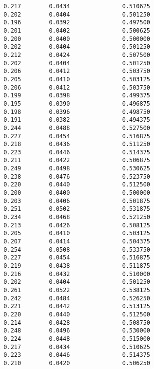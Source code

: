 \documentclass[
  letterpaper,
  DIV=11,
  numbers=noendperiod]{scrartcl}
\begin{document}
\begin{verbatim}
  0.217        0.0434               0.510625              
  0.202        0.0404               0.501250              
  0.196        0.0392               0.497500              
  0.201        0.0402               0.500625              
  0.200        0.0400               0.500000              
  0.202        0.0404               0.501250              
  0.212        0.0424               0.507500              
  0.202        0.0404               0.501250              
  0.206        0.0412               0.503750              
  0.205        0.0410               0.503125              
  0.206        0.0412               0.503750              
  0.199        0.0398               0.499375              
  0.195        0.0390               0.496875              
  0.198        0.0396               0.498750              
  0.191        0.0382               0.494375              
  0.244        0.0488               0.527500              
  0.227        0.0454               0.516875              
  0.218        0.0436               0.511250              
  0.223        0.0446               0.514375              
  0.211        0.0422               0.506875              
  0.249        0.0498               0.530625              
  0.238        0.0476               0.523750              
  0.220        0.0440               0.512500              
  0.200        0.0400               0.500000              
  0.203        0.0406               0.501875              
  0.251        0.0502               0.531875              
  0.234        0.0468               0.521250              
  0.213        0.0426               0.508125              
  0.205        0.0410               0.503125              
  0.207        0.0414               0.504375              
  0.254        0.0508               0.533750              
  0.227        0.0454               0.516875              
  0.219        0.0438               0.511875              
  0.216        0.0432               0.510000              
  0.202        0.0404               0.501250              
  0.261        0.0522               0.538125              
  0.242        0.0484               0.526250              
  0.221        0.0442               0.513125              
  0.220        0.0440               0.512500              
  0.214        0.0428               0.508750              
  0.248        0.0496               0.530000              
  0.224        0.0448               0.515000              
  0.217        0.0434               0.510625              
  0.223        0.0446               0.514375              
  0.210        0.0420               0.506250              

\end{verbatim}
\end{document}
